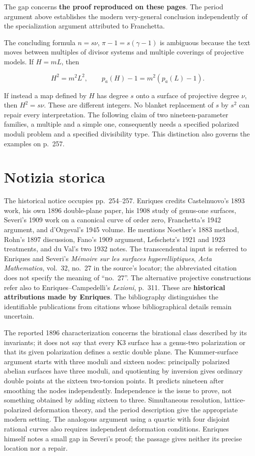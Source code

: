 The gap concerns \textbf{the proof reproduced on these pages}. The period argument above establishes the modern very-general conclusion independently of the specialization argument attributed to Franchetta.

The concluding formula \(n=s\nu\), \(\pi-1=s(\gamma-1)\) is ambiguous because the text moves between multiples of divisor systems and multiple coverings of projective models. If \(H=mL\), then

\[
H^2=m^2L^2,\qquad p_a(H)-1=m^2(p_a(L)-1).
\]

If instead a map defined by \(H\) has degree \(s\) onto a surface of projective degree \(\nu\), then \(H^2=s\nu\). These are different integers. No blanket replacement of \(s\) by \(s^2\) can repair every interpretation. The following claim of two nineteen-parameter families, a multiple and a simple one, consequently needs a specified polarized moduli problem and a specified divisibility type. This distinction also governs the examples on p.~257.

\section{Notizia storica}\label{cp2-vii-3}

The historical notice occupies pp.~254--257. Enriques credits Castelnuovo's 1893 work, his own 1896 double-plane paper, his 1908 study of genus-one surfaces, Severi's 1909 work on a canonical curve of order zero, Franchetta's 1942 argument, and d'Orgeval's 1945 volume. He mentions Noether's 1883 method, Rohn's 1897 discussion, Fano's 1909 argument, Lefschetz's 1921 and 1923 treatments, and du Val's two 1932 notes. The transcendental input is referred to Enriques and Severi's \emph{M\'emoire sur les surfaces hyperelliptiques}, \emph{Acta Mathematica}, vol.~32, no.~27 in the source's locator; the abbreviated citation does not specify the meaning of ``no.~27''. The alternative projective constructions refer also to Enriques--Campedelli's \emph{Lezioni}, p.~311. These are \textbf{historical attributions made by Enriques}. The bibliography distinguishes the identifiable publications from citations whose bibliographical details remain uncertain. 

The reported 1896 characterization concerns the birational class described by its invariants; it does not say that every K3 surface has a genus-two polarization or that its given polarization defines a sextic double plane. The Kummer-surface argument starts with three moduli and sixteen nodes: principally polarized abelian surfaces have three moduli, and quotienting by inversion gives ordinary double points at the sixteen two-torsion points. It predicts nineteen after smoothing the nodes independently. Independence is the issue to prove, not something obtained by adding sixteen to three. Simultaneous resolution, lattice-polarized deformation theory, and the period description give the appropriate modern setting. The analogous argument using a quartic with four disjoint rational curves also requires independent deformation conditions. Enriques himself notes a small gap in Severi's proof; the passage gives neither its precise location nor a repair.

